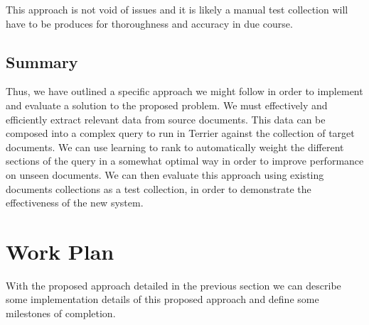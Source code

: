 \documentclass{mprop}
\begin{document}
This approach is not void of issues and it is likely a manual test collection will have to be produces for thoroughness and accuracy in due course.

\subsection{Summary}
Thus, we have outlined a specific approach we might follow in order to implement and evaluate a solution to the proposed problem. We must effectively and efficiently extract relevant data from source documents. This data can be composed into a complex query to run in Terrier against the collection of target documents. We can use learning to rank to automatically weight the different sections of the query in a somewhat optimal way in order to improve performance on unseen documents. We can then evaluate this approach using existing documents collections as a test collection, in order to demonstrate the effectiveness of the new system.

\section{Work Plan} \label{work_plan}
With the proposed approach detailed in the previous section we can describe some implementation details of this proposed approach and define some milestones of completion.



\end{document}
